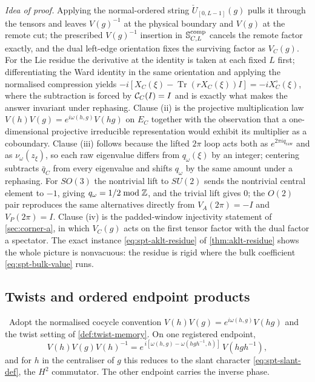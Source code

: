 \emph{Idea of proof.} Applying the normal-ordered string
$\check U_{[0,L-1]}(g)$ pulls it through the tensors and leaves $V(g)^{-1}$ at
the physical boundary and $V(g)$ at the remote cut; the prescribed $V(g)^{-1}$
insertion in $\mathbb{S}^{\mathrm{comp}}_{C,L}$ cancels the remote factor exactly,
and the dual left-edge orientation fixes the surviving factor as $V_C(g)$.
For the Lie residue the derivative at the identity is taken at each fixed $L$
first; differentiating the Ward identity in the same orientation and applying
the normalised compression yields
$-i[X_C(\xi)-\operatorname{Tr}(rX_C(\xi))I]=-iX^{\circ}_C(\xi)$, where the subtraction is
forced by $\mathcal{C}_C(I)=I$ and is exactly what makes the answer invariant under
rephasing. Clause (ii) is the projective multiplication law
$V(h)V(g)=e^{i\omega(h,g)}V(hg)$ on $E_C$ together with the observation that a
one-dimensional projective irreducible representation would exhibit its
multiplier as a coboundary. Clause (iii) follows because the lifted $2\pi$
loop acts both as $e^{2\pi i q_{\mathrm{raw}}}$ and as $\nu_\omega(z_\xi)$, so
each raw eigenvalue differs from $q_\omega(\xi)$ by an integer; centering
subtracts $\bar q_C$ from every eigenvalue and shifts $q_\omega$ by the same
amount under a rephasing. For $SO(3)$ the nontrivial lift to $SU(2)$ sends the
nontrivial central element to $-1$, giving $q_\omega=1/2\bmod\mathbb{Z}$, and the
trivial lift gives $0$; the $O(2)$ pair reproduces the same alternatives
directly from $V_A(2\pi)=-I$ and $V_P(2\pi)=I$. Clause (iv) is the padded-window
injectivity statement of \cref{sec:corner-a}, in which $V_C(g)$ acts on the
first tensor factor with the dual factor a spectator. The exact instance
\eqref{eq:spt-aklt-residue} of \cref{thm:aklt-residue} shows the whole picture
is nonvacuous: the residue is rigid where the bulk coefficient
\eqref{eq:spt-bulk-value} runs.


\subsection{Twists and ordered endpoint products}

\begin{theorem}\label{thm:twist-slant}
\statusProved\ Adopt the normalised cocycle convention
$V(h)V(g)=e^{i\omega(h,g)}V(hg)$ and the twist setting of
\cref{def:twist-memory}. On one registered endpoint,
\begin{equation}
  V(h)V(g)V(h)^{-1}
   =e^{\,i[\omega(h,g)-\omega(hgh^{-1},h)]}\,V(hgh^{-1}),
  \label{eq:spt-conjugation}
\end{equation}
and for $h$ in the centraliser of $g$ this reduces to the slant character
\eqref{eq:spt-slant-def}, the $H^{2}$ commutator. The other endpoint carries
the inverse phase.
\end{theorem}

